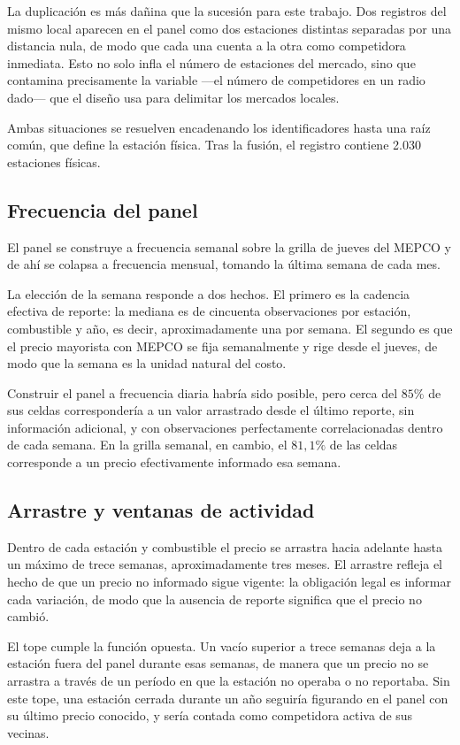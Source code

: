 La duplicación es más dañina que la sucesión para este trabajo. Dos registros
del mismo local aparecen en el panel como dos estaciones distintas separadas
por una distancia nula, de modo que cada una cuenta a la otra como competidora
inmediata. Esto no solo infla el número de estaciones del mercado, sino que
contamina precisamente la variable —el número de competidores en un radio
dado— que el diseño usa para delimitar los mercados locales.

Ambas situaciones se resuelven encadenando los identificadores hasta una raíz
común, que define la estación física. Tras la fusión, el registro contiene
2.030 estaciones físicas.

\subsection{Frecuencia del panel}

El panel se construye a frecuencia semanal sobre la grilla de jueves del MEPCO
y de ahí se colapsa a frecuencia mensual, tomando la última semana de cada mes.

La elección de la semana responde a dos hechos. El primero es la cadencia
efectiva de reporte: la mediana es de cincuenta observaciones por estación,
combustible y año, es decir, aproximadamente una por semana. El segundo es que
el precio mayorista con MEPCO se fija semanalmente y rige desde el jueves, de
modo que la semana es la unidad natural del costo.

Construir el panel a frecuencia diaria habría sido posible, pero cerca del
$85\%$ de sus celdas correspondería a un valor arrastrado desde el último
reporte, sin información adicional, y con observaciones perfectamente
correlacionadas dentro de cada semana. En la grilla semanal, en cambio, el
$81{,}1\%$ de las celdas corresponde a un precio efectivamente informado esa
semana.

\subsection{Arrastre y ventanas de actividad}

Dentro de cada estación y combustible el precio se arrastra hacia adelante
hasta un máximo de trece semanas, aproximadamente tres meses. El arrastre
refleja el hecho de que un precio no informado sigue vigente: la obligación
legal es informar cada variación, de modo que la ausencia de reporte significa
que el precio no cambió.

El tope cumple la función opuesta. Un vacío superior a trece semanas deja a la
estación fuera del panel durante esas semanas, de manera que un precio no se
arrastra a través de un período en que la estación no operaba o no reportaba.
Sin este tope, una estación cerrada durante un año seguiría figurando en el
panel con su último precio conocido, y sería contada como competidora activa de
sus vecinas.

